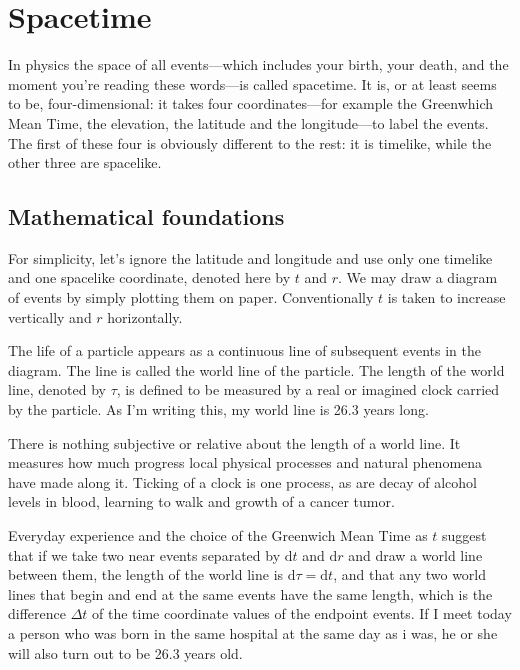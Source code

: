 \documentclass[11pt,oneside%
]{memoir}
\newcommand{\dd}{\mathrm{d}}
\begin{document}

\chapter{Spacetime}

In physics the space of all events---which includes your birth, your death, and the moment you're reading these words---is called spacetime. It is, or at least seems to be, four-dimensional: it takes four coordinates---for example the Greenwhich Mean Time, the elevation, the latitude and the longitude---to label the events. The first of these four is obviously different to the rest: it is timelike, while the other three are spacelike.

\section{Mathematical foundations}

For simplicity, let's ignore the latitude and longitude and use only one timelike and one spacelike coordinate, denoted here by \(t\) and \(r\). We may draw a diagram of events by simply plotting them on paper. Conventionally \(t\) is taken to increase vertically and \(r\) horizontally.

\newcommand{\myage}{26.3}

The life of a particle appears as a continuous line of subsequent events in the diagram. The line is called the world line of the particle. The length of the world line, denoted by \(\tau\), is defined to be measured by a real or imagined clock carried by the particle. As I'm writing this, my world line is {\myage} years long.

There is nothing subjective or relative about the length of a world line. It measures how much progress local physical processes and natural phenomena have made along it. Ticking of a clock is one process, as are decay of alcohol levels in blood, learning to walk and growth of a cancer tumor.

Everyday experience and the choice of the Greenwich Mean Time as \(t\) suggest that if we take two near events separated by \(\dd t\) and \(\dd r\) and draw a world line between them, the length of the world line is \(\dd\tau = \dd t\), and that any two world lines that begin and end at the same events have the same length, which is the difference \(\Delta t\) of the time coordinate values of the endpoint events. If I meet today a person who was born in the same hospital at the same day as i was, he or she will also turn out to be {\myage} years old.
\end{document}
